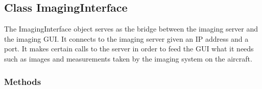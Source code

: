 

\subsection{Class ImagingInterface}

    \label{client_rest:ImagingInterface}
The ImagingInterface object serves as the bridge between the imaging server
and the imaging GUI. It connects to the imaging server given an IP address 
and a port. It makes certain calls to the server in order to feed the GUI 
what it needs such as images and measurements taken by the imaging system 
on the aircraft.



  \subsubsection{Methods}

    \label{client_rest:ImagingInterface:__init__}

    \vspace{0.5ex}

